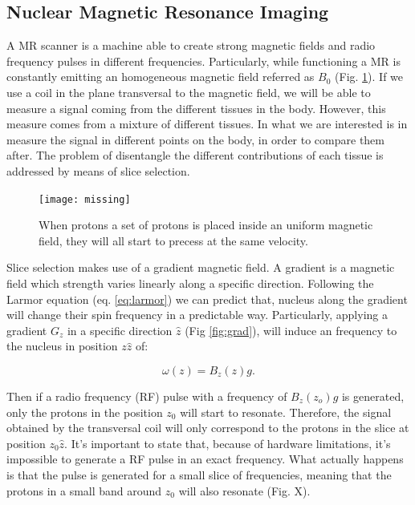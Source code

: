 \subsection{Nuclear Magnetic Resonance Imaging}

A MR scanner is a machine able to create strong magnetic fields and radio
frequency pulses in different frequencies. Particularly, while functioning
a MR is constantly emitting an homogeneous magnetic field referred as $B_0$
(Fig. \ref{fig:unif}). If we use a coil in the plane transversal to the 
magnetic field, we will be able to measure a signal coming from the different
tissues in the body. However, this measure comes from a mixture of different
tissues. In what we are interested is in measure the signal in different points
on the body, in order to compare them after. The problem of disentangle the 
different contributions of each tissue is addressed by means of slice selection. 

\begin{figure}[h]
    \texttt{[image: missing]}
    \caption{When protons a set of protons is placed inside an uniform magnetic field, they will all start to precess at the same velocity.}
     \label{fig:unif}
\end{figure}

Slice selection makes use of a gradient magnetic field. A gradient is a magnetic
field which strength varies linearly along a specific direction. Following the
Larmor equation (eq. \ref{eq:larmor}) we can predict that, nucleus along the
gradient will change their spin frequency in a predictable way. Particularly,
applying a gradient $G_z$ in a specific direction $\hat z$ (Fig \ref{fig:grad}),
will induce an frequency to the nucleus in position $z \hat z$ of:

$$\omega(z) = B_z(z) g.$$

Then if a radio frequency (RF) pulse with a frequency of $B_z(z_o) g$ is generated,
only the protons in the position $z_0$ will start to resonate. Therefore, the
signal obtained by the transversal coil will only correspond to the protons in
the slice at position $z_0 \hat z $. It's important to state that, because of
hardware limitations, it's impossible to generate a RF pulse in an exact frequency.
What actually happens is that the pulse is generated for a small slice of
frequencies, meaning that the protons in a small band around $z_0$ will also
resonate (Fig. X).

